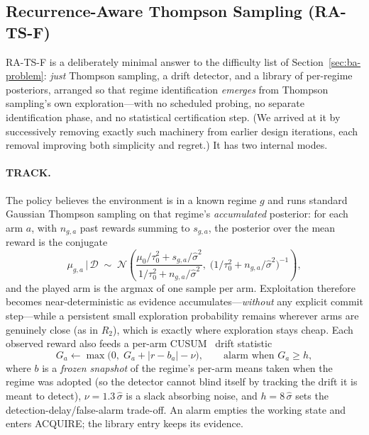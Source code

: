 \documentclass[11pt,a4paper]{article}
\begin{document}
\subsection{Recurrence-Aware Thompson Sampling (RA-TS-F)}\label{sec:ba-rats}
RA-TS-F is a deliberately minimal answer to the difficulty list of
Section~\ref{sec:ba-problem}: \emph{just} Thompson sampling, a drift detector,
and a library of per-regime posteriors, arranged so that regime identification
\emph{emerges} from Thompson sampling's own exploration---with no scheduled
probing, no separate identification phase, and no statistical certification
step. (We arrived at it by successively removing exactly such machinery from
earlier design iterations, each removal improving both simplicity and regret.)
It has two internal modes.

\paragraph{TRACK.} The policy believes the environment is in a known regime
$g$ and runs standard Gaussian Thompson sampling on that regime's
\emph{accumulated} posterior: for each arm $a$, with $n_{g,a}$ past rewards
summing to $s_{g,a}$, the posterior over the mean reward is the conjugate
\begin{equation}
  \mu_{g,a} \,\big|\, \mathcal D \;\sim\; \mathcal N\!\left(
  \frac{\mu_0/\tau_0^2 + s_{g,a}/\hat\sigma^2}{1/\tau_0^2 + n_{g,a}/\hat\sigma^2},
  \;\Big(1/\tau_0^2 + n_{g,a}/\hat\sigma^2\Big)^{-1}\right),
  \label{eq:posterior}
\end{equation}
and the played arm is the argmax of one sample per arm. Exploitation
therefore becomes near-deterministic as evidence accumulates---\emph{without}
any explicit commit step---while a persistent small exploration probability
remains wherever arms are genuinely close (as in $R_2$), which is exactly
where exploration stays cheap. Each observed reward also feeds a per-arm
CUSUM~\cite{Page} drift statistic
\begin{equation}
  G_a \leftarrow \max\!\big(0,\; G_a + |r - b_a| - \nu\big), \qquad
  \text{alarm when } G_a \ge h,
  \label{eq:cusum}
\end{equation}
where $b$ is a \emph{frozen snapshot} of the regime's per-arm means taken when
the regime was adopted (so the detector cannot blind itself by tracking the
drift it is meant to detect), $\nu = 1.3\,\hat\sigma$ is a slack absorbing
noise, and $h = 8\,\hat\sigma$ sets the detection-delay/false-alarm trade-off.
An alarm empties the working state and enters ACQUIRE; the library entry keeps
its evidence.
\end{document}
